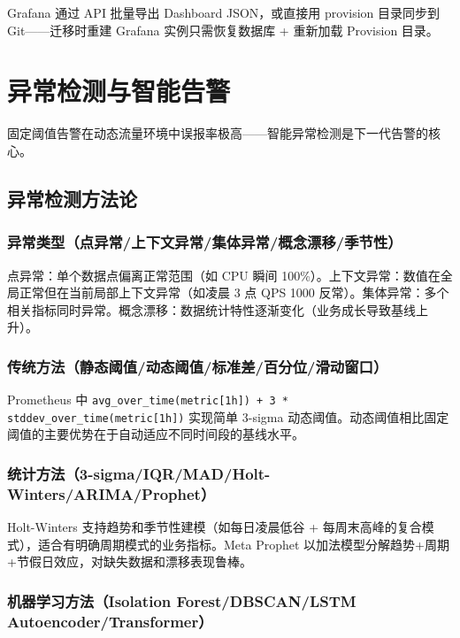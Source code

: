 \documentclass[12pt,UTF8]{ctexbook}
\begin{document}
Grafana 通过 API 批量导出 Dashboard JSON，或直接用 provision 目录同步到 Git——迁移时重建 Grafana 实例只需恢复数据库 + 重新加载 Provision 目录。


\chapter{异常检测与智能告警}
\label{chap:anomaly-detection}

固定阈值告警在动态流量环境中误报率极高——智能异常检测是下一代告警的核心。

  \section{异常检测方法论}
    \subsection{异常类型（点异常/上下文异常/集体异常/概念漂移/季节性）}

点异常：单个数据点偏离正常范围（如 CPU 瞬间 100\%）。上下文异常：数值在全局正常但在当前局部上下文异常（如凌晨 3 点 QPS 1000 反常）。集体异常：多个相关指标同时异常。概念漂移：数据统计特性逐渐变化（业务成长导致基线上升）。

    \subsection{传统方法（静态阈值/动态阈值/标准差/百分位/滑动窗口）}

Prometheus 中 \texttt{avg\_over\_time(metric[1h]) + 3 * stddev\_over\_time(metric[1h])} 实现简单 3-sigma 动态阈值。动态阈值相比固定阈值的主要优势在于自动适应不同时间段的基线水平。

    \subsection{统计方法（3-sigma/IQR/MAD/Holt-Winters/ARIMA/Prophet）}

Holt-Winters 支持趋势和季节性建模（如每日凌晨低谷 + 每周末高峰的复合模式），适合有明确周期模式的业务指标。Meta Prophet 以加法模型分解趋势+周期+节假日效应，对缺失数据和漂移表现鲁棒。

    \subsection{机器学习方法（Isolation Forest/DBSCAN/LSTM Autoencoder/Transformer）}
\end{document}
